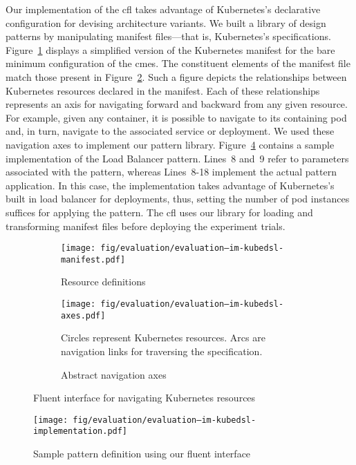 Our implementation of the \gls{cfl} takes advantage of Kubernetes's declarative configuration for devising architecture variants. We built a library of design patterns by manipulating manifest files---that is, Kubernetes's specifications. Figure~\ref{fig:evaluation--im-kubedsl-manifest} displays a simplified version of the Kubernetes manifest for the bare minimum configuration of the \gls{cmes}. The constituent elements of the manifest file match those present in Figure~\ref{fig:evaluation--im-kubedsl-axes}. Such a figure depicts the relationships between Kubernetes resources declared in the manifest. Each of these relationships represents an axis for navigating forward and backward from any given resource. For example, given any container, it is possible to navigate to its containing pod and, in turn, navigate to the associated service or deployment. We used these navigation axes to implement our pattern library. Figure~\ref{fig:evaluation--im-kubedsl-implementation} contains a sample implementation of the Load Balancer pattern. Lines~8 and~9 refer to parameters associated with the pattern, whereas Lines~8-18 implement the actual pattern application. In this case, the implementation takes advantage of Kubernetes's built in load balancer for deployments, thus, setting the number of pod instances suffices for applying the pattern. The \gls{cfl} uses our library for loading and transforming manifest files before deploying the experiment trials.

\begin{figure}[h]
	\centering
	\begin{subfigure}[b]{0.65\textwidth}
		\centering
		\texttt{[image: fig/evaluation/evaluation--im-kubedsl-manifest.pdf]}
		\caption{Resource definitions}
		\label{fig:evaluation--im-kubedsl-manifest}
	\end{subfigure}
	\begin{subfigure}[b]{0.64\textwidth}
		\centering
		\texttt{[image: fig/evaluation/evaluation--im-kubedsl-axes.pdf]}
		\caption{Abstract navigation axes}
		\label{fig:evaluation--im-kubedsl-axes}
		Circles represent Kubernetes resources. Arcs are navigation links for traversing the specification.
	\end{subfigure}
	\caption{Fluent interface for navigating Kubernetes resources}
	\label{fig:evaluation--im-kubedsl}
\end{figure}

\begin{figure}[h]
	\centering
	\texttt{[image: fig/evaluation/evaluation--im-kubedsl-implementation.pdf]}
	\caption{Sample pattern definition using our fluent interface}
	\label{fig:evaluation--im-kubedsl-implementation}
\end{figure}


